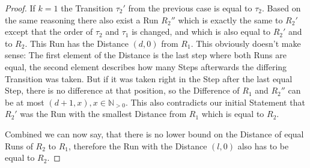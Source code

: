 \begin{proof}
If \(k = 1\) the Transition \(\tau_2'\) from the previous case is equal to \(\tau_2\).
Based on the same reasoning there also exist a Run \(R_2''\) which is exactly the same to \(R_2'\) except that the order of \(\tau_2\) and \(\tau_1\) is changed, and which is also equal to \(R_2'\) and to \(R_2\).
This Run has the Distance \((d, 0)\) from \(R_1\).
This obviously doesn't make sense: The first element of the Distance is the last step where both Runs are equal, the second element describes how many Steps afterwards the differing Transition was taken.
But if it was taken right in the Step after the last equal Step, there is no difference at that position, so the Difference of \(R_1\) and \(R_2''\) can be at most \((d+1, x), x \in \mathbb{N}_{>0}\).
This also contradicts our initial Statement that \(R_2'\) was the Run with the smallest Distance from \(R_1\) which is equal to \(R_2\).

Combined we can now say, that there is no lower bound on the Distance of equal Runs of \(R_2\) to \(R_1\), therefore the Run with the Distance \((l, 0)\) also has to be equal to \(R_2\).

\end{proof}




